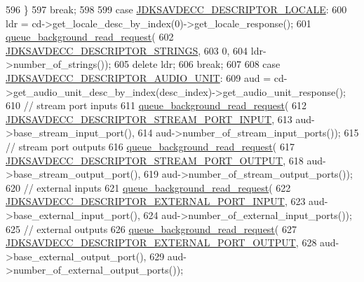 \begin{DoxyCode}
596         \}
597         \textcolor{keywordflow}{break};
598 
599     \textcolor{keywordflow}{case} \hyperlink{group__descriptor_ga5d552305c1813a87f014a434e974be4c}{JDKSAVDECC\_DESCRIPTOR\_LOCALE}:
600         ldr = cd->get\_locale\_desc\_by\_index(0)->get\_locale\_response();
601         \hyperlink{classavdecc__lib_1_1end__station__imp_a5dcbf7253fe2b67afcc2c41cc9afe826}{queue\_background\_read\_request}(
602             \hyperlink{group__descriptor_gaa93804189e6bcc937a95be69d6a6294b}{JDKSAVDECC\_DESCRIPTOR\_STRINGS},
603             0,
604             ldr->number\_of\_strings());
605         \textcolor{keyword}{delete} ldr;
606         \textcolor{keywordflow}{break};
607 
608     \textcolor{keywordflow}{case} \hyperlink{group__descriptor_gab23787344ad4773f6486ee9d4bfa4cd2}{JDKSAVDECC\_DESCRIPTOR\_AUDIO\_UNIT}:
609         aud = cd->get\_audio\_unit\_desc\_by\_index(desc\_index)->get\_audio\_unit\_response();
610         \textcolor{comment}{// stream port inputs}
611         \hyperlink{classavdecc__lib_1_1end__station__imp_a5dcbf7253fe2b67afcc2c41cc9afe826}{queue\_background\_read\_request}(
612             \hyperlink{group__descriptor_gabf97c9389e49a8c27f2192854f830eda}{JDKSAVDECC\_DESCRIPTOR\_STREAM\_PORT\_INPUT},
613             aud->base\_stream\_input\_port(),
614             aud->number\_of\_stream\_input\_ports());
615         \textcolor{comment}{// stream port outputs}
616         \hyperlink{classavdecc__lib_1_1end__station__imp_a5dcbf7253fe2b67afcc2c41cc9afe826}{queue\_background\_read\_request}(
617             \hyperlink{group__descriptor_gab28f87a9e7610f8441c1c4840d2c2fb9}{JDKSAVDECC\_DESCRIPTOR\_STREAM\_PORT\_OUTPUT},
618             aud->base\_stream\_output\_port(),
619             aud->number\_of\_stream\_output\_ports());
620         \textcolor{comment}{// external inputs}
621         \hyperlink{classavdecc__lib_1_1end__station__imp_a5dcbf7253fe2b67afcc2c41cc9afe826}{queue\_background\_read\_request}(
622             \hyperlink{group__descriptor_ga20b1f1b3c8549b4607fa248c9df38c82}{JDKSAVDECC\_DESCRIPTOR\_EXTERNAL\_PORT\_INPUT},
623             aud->base\_external\_input\_port(),
624             aud->number\_of\_external\_input\_ports());
625         \textcolor{comment}{// external outputs}
626         \hyperlink{classavdecc__lib_1_1end__station__imp_a5dcbf7253fe2b67afcc2c41cc9afe826}{queue\_background\_read\_request}(
627             \hyperlink{group__descriptor_ga4a49e95850c4a63f051a9fe9aebde7e8}{JDKSAVDECC\_DESCRIPTOR\_EXTERNAL\_PORT\_OUTPUT},
628             aud->base\_external\_output\_port(),
629             aud->number\_of\_external\_output\_ports());

\end{DoxyCode}
